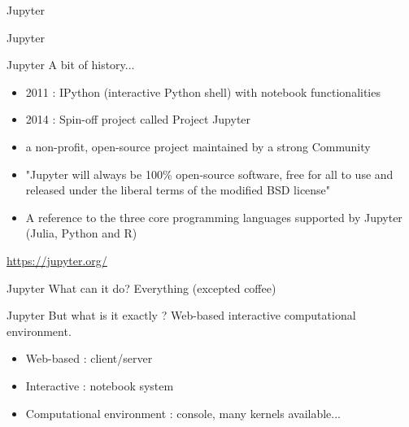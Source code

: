 \begin{frame}{Jupyter}

\huge{Jupyter}

\end{frame}

\begin{frame}{Jupyter}
A bit of history...
\begin{itemize}
    \item 2011 : IPython (interactive Python shell) with notebook functionalities
    \item 2014 : Spin-off project called Project Jupyter
    \item a non-profit, open-source project maintained by a strong Community
    \item "Jupyter will always be 100\% open-source software, free for all to use and released under the liberal terms of the modified BSD license"
    \item A reference to the three core programming languages supported by Jupyter (Julia, Python and R)
\end{itemize}

\url{https://jupyter.org/}

\end{frame}

\begin{frame}{Jupyter}
What can it do? \newline \pause
Everything (excepted coffee)
\end{frame}

\begin{frame}{Jupyter}
But what is it exactly ? \newline \pause
Web-based interactive computational environment. \newline \pause
\begin{itemize}
    \item<3-> Web-based : client/server
    \item<4-> Interactive : notebook system
    \item<5-> Computational environment : console, many kernels available...
\end{itemize}
\end{frame}

